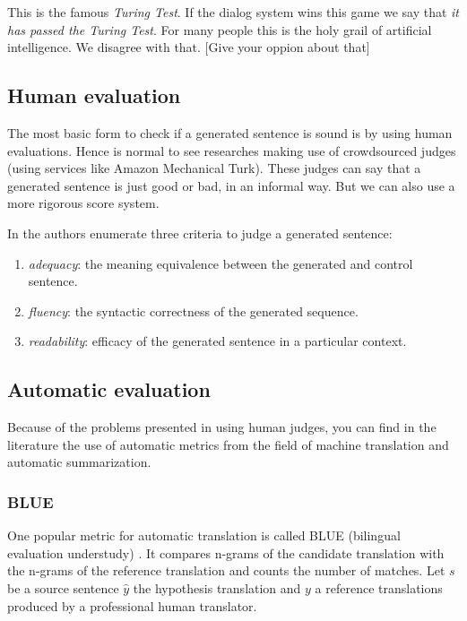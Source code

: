 \par This is the famous \textit{Turing Test}. If the dialog system wins this game we say that \textit{it has passed the Turing Test}. For many people this is the holy grail of artificial intelligence. We disagree with that. [Give your oppion about that]


\subsection{Human evaluation}

The most basic form to check if a generated sentence is sound is by using human evaluations. Hence is normal to see researches making use of crowdsourced judges (using services like Amazon Mechanical Turk). These judges can say that a generated sentence is just good or bad, in an informal way. But we can also use a more rigorous score system. 


In \cite{Stent} the authors enumerate three criteria to judge a generated sentence:

\begin{enumerate}
\item \textit{adequacy}: the meaning equivalence between the generated and control sentence. 
\item \textit{fluency}: the syntactic correctness of the generated sequence.
\item \textit{readability}: efficacy of the generated sentence in a particular context.
\end{enumerate}



\subsection{Automatic evaluation}


Because of the problems presented in using human judges, you can find in the literature the use of automatic metrics from the field of machine translation and automatic summarization.

\subsubsection{BLUE}

One popular metric for automatic translation is called BLUE (bilingual evaluation understudy) \cite{Papineni2001}. It compares n-grams of the candidate translation with the n-grams of the reference translation and counts the number of matches. Let $s$ be a source sentence $\hat{y}$ the hypothesis translation and $y$ a reference translations produced by a professional human translator. 

